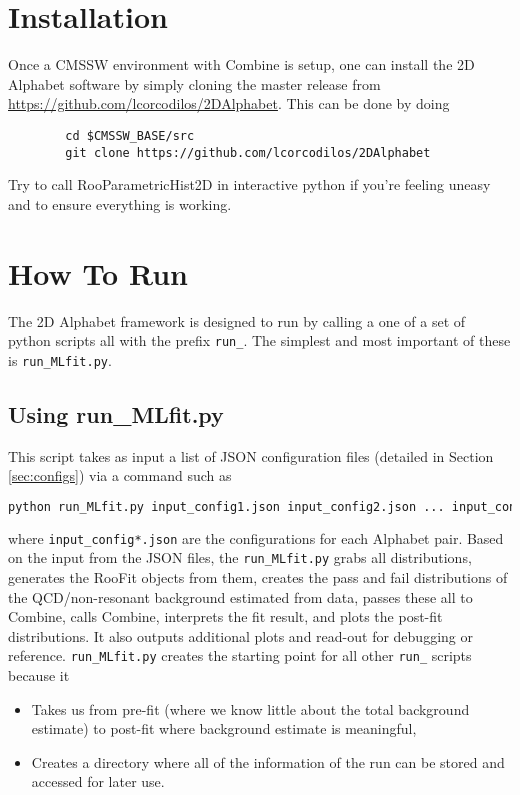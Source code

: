 \documentclass[letter]{article}
\begin{document}

\section{Installation}

    Once a CMSSW environment with Combine is setup, one can install the 2D Alphabet software by simply cloning the master release from \url{https://github.com/lcorcodilos/2DAlphabet}. This can be done by doing
    \begin{lstlisting}
        cd $CMSSW_BASE/src
        git clone https://github.com/lcorcodilos/2DAlphabet
    \end{lstlisting}
    
    Try to call RooParametricHist2D in interactive python if you're feeling uneasy and to ensure everything is working. 

\section{How To Run}
    The 2D Alphabet framework is designed to run by calling a one of a set of python scripts all with the prefix \verb"run_". The simplest and most important of these is \verb"run_MLfit.py". 

    \subsection{Using run\_MLfit.py}
        This script takes as input a list of JSON configuration files (detailed in Section \ref{sec:configs}) via a command such as

        \begin{lstlisting}[language=python]
            python run_MLfit.py input_config1.json input_config2.json ... input_configN.json
        \end{lstlisting}

        where \verb"input_config*.json" are the configurations for each Alphabet pair. Based on the input from the JSON files, the \verb"run_MLfit.py" grabs all distributions, generates the RooFit objects from them, creates the pass and fail distributions of the QCD/non-resonant background estimated from data, passes these all to Combine, calls Combine, interprets the fit result, and plots the post-fit distributions. It also outputs additional plots and read-out for debugging or reference. \verb"run_MLfit.py" creates the starting point for all other \verb"run_" scripts because it
        \begin{itemize}
            \item Takes us from pre-fit (where we know little about the total background estimate) to post-fit where background estimate is meaningful,
            \item Creates a directory where all of the information of the run can be stored and accessed for later use.
        \end{itemize}
\end{document}
